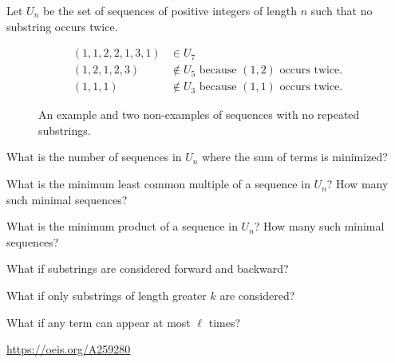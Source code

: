 \documentclass{article}
\begin{document}
Let $U_n$ be the set of sequences of positive integers of length $n$ such that
no substring occurs twice.
\begin{figure}[!h]
  \centering
  \begin{align*}
    (1, 1, 2, 2, 1, 3, 1) &\in U_7\\
    (1, 2, 1, 2, 3) &\not\in U_5 \text{ because } (1, 2) \text{ occurs twice.}\\
    (1, 1, 1) &\not\in U_3 \text{ because } (1, 1) \text{ occurs twice.}
  \end{align*}
  \caption{
    An example and two non-examples of sequences with no repeated substrings.
  }
\end{figure}

\begin{question}
  What is the number of sequences in $U_n$ where the sum of terms is minimized?
\end{question}

\begin{related}
  \item What is the minimum least common multiple of a sequence in $U_n$?
    How many such minimal sequences?
  \item What is the minimum product of a sequence in $U_n$?
    How many such minimal sequences?
  \item What if substrings are considered forward and backward?
  \item What if only substrings of length greater $k$ are considered?
  \item What if any term can appear at most $\ell$ times?
\end{related}

\begin{references}
  \item \url{https://oeis.org/A259280}
\end{references}
\end{document}
